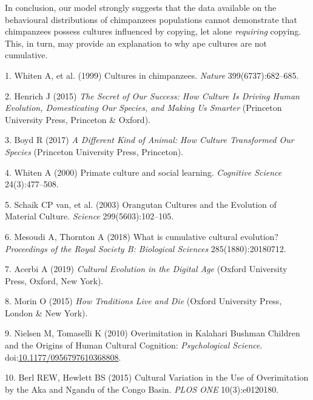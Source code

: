 \documentclass[9pt,twocolumn,twoside,]{pnas-new}
\begin{document}
In conclusion, our model strongly suggests that the data available on
the behavioural distributions of chimpanzees populations cannot
demonstrate that chimpanzees possess cultures influenced by copying, let
alone \emph{requiring} copying. This, in turn, may provide an
explanation to why ape cultures are not cumulative.

\showmatmethods
\showacknow
\pnasbreak

\hypertarget{refs}{}
\hypertarget{ref-whiten_cultures_1999}{}
1. Whiten A, et al. (1999) Cultures in chimpanzees. \emph{Nature}
399(6737):682--685.

\hypertarget{ref-henrich_secret_2015}{}
2. Henrich J (2015) \emph{The Secret of Our Success: How Culture Is
Driving Human Evolution, Domesticating Our Species, and Making Us
Smarter} (Princeton University Press, Princeton \& Oxford).

\hypertarget{ref-boyd_different_2017}{}
3. Boyd R (2017) \emph{A Different Kind of Animal: How Culture
Transformed Our Species} (Princeton University Press, Princeton).

\hypertarget{ref-whiten_primate_2000}{}
4. Whiten A (2000) Primate culture and social learning. \emph{Cognitive
Science} 24(3):477--508.

\hypertarget{ref-van_schaik_orangutan_2003}{}
5. Schaik CP van, et al. (2003) Orangutan Cultures and the Evolution of
Material Culture. \emph{Science} 299(5603):102--105.

\hypertarget{ref-mesoudi_what_2018}{}
6. Mesoudi A, Thornton A (2018) What is cumulative cultural evolution?
\emph{Proceedings of the Royal Society B: Biological Sciences}
285(1880):20180712.

\hypertarget{ref-acerbi_cultural_2019}{}
7. Acerbi A (2019) \emph{Cultural Evolution in the Digital Age} (Oxford
University Press, Oxford, New York).

\hypertarget{ref-morin_how_2015}{}
8. Morin O (2015) \emph{How Traditions Live and Die} (Oxford University
Press, London \& New York).

\hypertarget{ref-nielsen_overimitation_2010}{}
9. Nielsen M, Tomaselli K (2010) Overimitation in Kalahari Bushman
Children and the Origins of Human Cultural Cognition:
\emph{Psychological Science}.
doi:\href{https://doi.org/10.1177/0956797610368808}{10.1177/0956797610368808}.

\hypertarget{ref-berl_cultural_2015}{}
10. Berl REW, Hewlett BS (2015) Cultural Variation in the Use of
Overimitation by the Aka and Ngandu of the Congo Basin. \emph{PLOS ONE}
10(3):e0120180.
\end{document}
